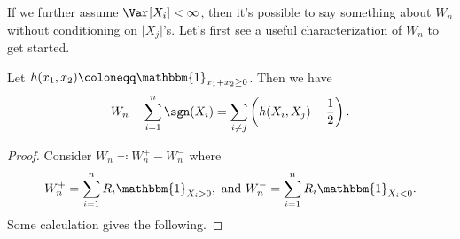 If we further assume \(\Var_{}[X_i] < \infty \), then it's possible to say something about \(W_n\) without conditioning on \(\lvert X_j \rvert \)'s. Let's first see a useful characterization of \(W_n\) to get started.

\begin{proposition}\label{prop:Wilcoxon-signed-rank-test}
	Let \(h(x_1, x_2) \coloneqq \mathbbm{1}_{x_1 + x_2 \geq 0}\). Then we have
	\[
		W_n - \sum_{i=1}^{n} \sgn (X_i)
		= \sum_{i \neq j} \left( h(X_i , X_j) - \frac{1}{2} \right).
	\]
\end{proposition}
\begin{proof}
	Consider \(W_n \eqqcolon W_n^+ - W_n^-\) where
	\[
		W_n^+ = \sum_{i=1}^{n} R_i \mathbbm{1}_{X_i > 0} ,\text{ and }
		W_n^- = \sum_{i=1}^{n} R_i \mathbbm{1}_{X_i < 0}.
	\]
	Some calculation gives the following.


\end{proof}
